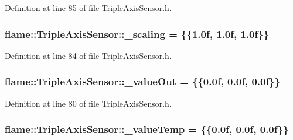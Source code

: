 Definition at line 85 of file Triple\-Axis\-Sensor.\-h.

\hypertarget{classflame_1_1_triple_axis_sensor_a79e7f229439c0c0e747a2fa8c30ecaba}{
\subsubsection[{\-\_\-scaling}]{ flame\-::\-Triple\-Axis\-Sensor\-::\-\_\-scaling = \{\{1.\-0f, 1.\-0f, 1.\-0f\}\}\hspace{0.3cm}{\ttfamily [protected]}}}\label{classflame_1_1_triple_axis_sensor_a79e7f229439c0c0e747a2fa8c30ecaba}


Definition at line 84 of file Triple\-Axis\-Sensor.\-h.

\hypertarget{classflame_1_1_triple_axis_sensor_aadbb6bb4aa35232bf548c3a9d83ce284}{
\subsubsection[{\-\_\-value\-Out}]{ flame\-::\-Triple\-Axis\-Sensor\-::\-\_\-value\-Out = \{\{0.\-0f, 0.\-0f, 0.\-0f\}\}\hspace{0.3cm}{\ttfamily [protected]}}}\label{classflame_1_1_triple_axis_sensor_aadbb6bb4aa35232bf548c3a9d83ce284}


Definition at line 80 of file Triple\-Axis\-Sensor.\-h.

\hypertarget{classflame_1_1_triple_axis_sensor_a5db946bd07a26418e39d5e5f000a8209}{
\subsubsection[{\-\_\-value\-Temp}]{ flame\-::\-Triple\-Axis\-Sensor\-::\-\_\-value\-Temp = \{\{0.\-0f, 0.\-0f, 0.\-0f\}\}\hspace{0.3cm}{\ttfamily [protected]}}}\label{classflame_1_1_triple_axis_sensor_a5db946bd07a26418e39d5e5f000a8209}


